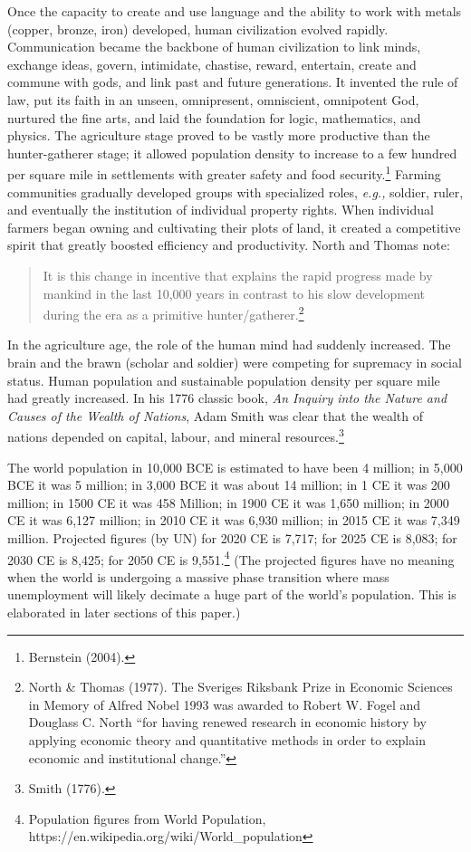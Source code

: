 \begin{multicols}{2}
Once the capacity to create and use language and the ability to work with metals (copper, bronze, iron) developed, human civilization evolved rapidly. Communication became the backbone of human civilization to link minds, exchange ideas, govern, intimidate, chastise, reward, entertain, create and commune with gods, and link past and future generations. It invented the rule of law, put its faith in an unseen, omnipresent, omniscient, omnipotent God, nurtured the fine arts, and laid the foundation for logic, mathematics, and physics. The agriculture stage proved to be vastly more productive than the hunter-gatherer stage; it allowed population density to increase to a few hundred per square mile in settlements with greater safety and food security.\footnote{Bernstein (2004).} Farming communities gradually developed groups with specialized roles, \textit{e.g.,} soldier, ruler, and eventually the institution of individual property rights. When individual farmers began owning and cultivating their plots of land, it created a competitive spirit that greatly boosted efficiency and productivity. North and Thomas note: 

\begin{quote}
It is this change in incentive that explains the rapid progress made by mankind in the last 10,000 years in contrast to his slow development during the era as a primitive hunter/gatherer.\footnote{North \& Thomas (1977). The Sveriges Riksbank Prize in Economic Sciences in Memory of Alfred Nobel 1993 was awarded to Robert W. Fogel and Douglass C. North “for having renewed research in economic history by applying economic theory and quantitative methods in order to explain economic and institutional change.”}
\end{quote}
\smallskip

In the agriculture age, the role of the human mind had suddenly increased. The brain and the brawn (scholar and soldier) were competing for supremacy in social status. Human population and sustainable population density per square mile had greatly increased. In his 1776 classic book, \textit{An Inquiry into the Nature and Causes of the Wealth of Nations}, Adam Smith was clear that the wealth of nations depended on capital, labour, and mineral resources.\footnote{Smith (1776).}

The world population in 10,000 BCE is estimated to have been 4 million; in 5,000 BCE it was 5 million; in 3,000 BCE it was about 14 million; in 1 CE it was 200 million; in 1500 CE it was 458 Million; in 1900 CE it was 1,650 million; in 2000 CE it was 6,127 million; in 2010 CE it was 6,930 million; in 2015 CE it was 7,349 million. Projected figures (by UN) for 2020 CE is 7,717; for 2025 CE is 8,083; for 2030 CE is 8,425; for 2050 CE is 9,551.\footnote{Population figures from World Population, https://en.wikipedia.org/wiki/World\_population}  (The projected figures have no meaning when the world is undergoing a massive phase transition where mass unemployment will likely decimate a huge part of the world's population. This is elaborated in later sections of this paper.)


\end{multicols}
